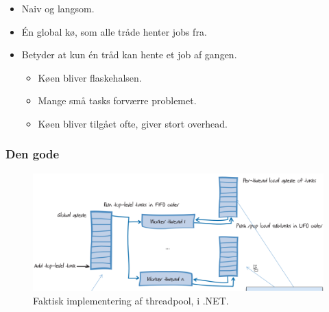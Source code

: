 \begin{itemize}
	\item Naiv og langsom.
	\item Én global kø, som alle tråde henter jobs fra.
	\item Betyder at kun én tråd kan hente et job af gangen.
	\begin{itemize}
		\item Køen bliver flaskehalsen.
		\item Mange små tasks forværre problemet.
		\item Køen bliver tilgået ofte, giver stort overhead.
	\end{itemize}
\end{itemize}

\subsubsection{Den gode}

\begin{figure}[h]
	\centering
	\includegraphics[width=\linewidth]{figs/goodthreadpool}
	\caption{Faktisk implementering af threadpool, i .NET.}
	\label{fig:goodthreadpool}
\end{figure}

